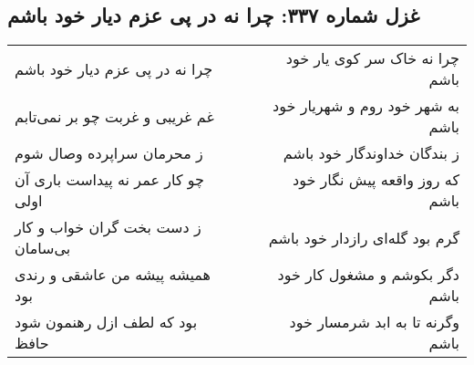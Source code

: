 \begin{center}
\section*{غزل شماره ۳۳۷: چرا نه در پی عزم دیار خود باشم}
\label{sec:sh337}
\begin{longtable}{l p{0.5cm} r}
چرا نه در پی عزم دیار خود باشم
&&
چرا نه خاک سر کوی یار خود باشم
\\
غم غریبی و غربت چو بر نمی‌تابم
&&
به شهر خود روم و شهریار خود باشم
\\
ز محرمان سراپرده وصال شوم
&&
ز بندگان خداوندگار خود باشم
\\
چو کار عمر نه پیداست باری آن اولی
&&
که روز واقعه پیش نگار خود باشم
\\
ز دست بخت گران خواب و کار بی‌سامان
&&
گرم بود گله‌ای رازدار خود باشم
\\
همیشه پیشه من عاشقی و رندی بود
&&
دگر بکوشم و مشغول کار خود باشم
\\
بود که لطف ازل رهنمون شود حافظ
&&
وگرنه تا به ابد شرمسار خود باشم
\\
\end{longtable}
\end{center}
